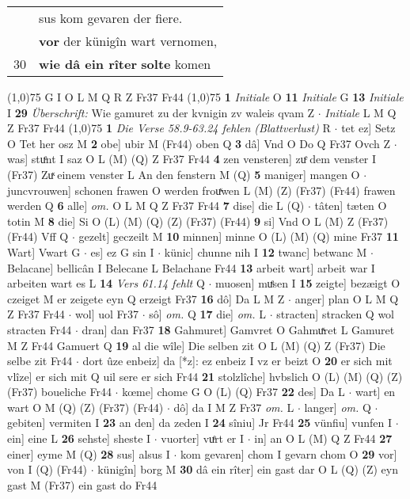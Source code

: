\documentclass[8pt,a4paper,notitlepage]{article}
\begin{document}
\begin{table}[ht]
\begin{minipage}[t]{0.5\linewidth}
\begin{tabular}{rl}
 & sus kom gevaren der fiere.\\ 
 & \textbf{vor} der künigîn wart vernomen,\\ 
30 & \textbf{wie dâ ein rîter} \textbf{solte} komen\\ 
\end{tabular}
\scriptsize
\line(1,0){75} \newline
G I O L M Q R Z Fr37 Fr44 \newline
\line(1,0){75} \newline
\textbf{1} \textit{Initiale} O  \textbf{11} \textit{Initiale} G  \textbf{13} \textit{Initiale} I  \textbf{29} \textit{Überschrift:} Wie gamuret zu der kvnigin zv waleis qvam Z   $\cdot$ \textit{Initiale} L M Q Z Fr37 Fr44  \newline
\line(1,0){75} \newline
\textbf{1} \textit{Die Verse 58.9-63.24 fehlen (Blattverlust)} R   $\cdot$ tet ez] Setz O Tet her osz M \textbf{2} obe] ubir M (Fr44) oben Q \textbf{3} dâ] Vnd O Do Q Fr37 Ovch Z  $\cdot$ was] stuͤnt I saz O L (M) (Q) Z Fr37 Fr44 \textbf{4} zen vensteren] zuͤ dem venster I (Fr37) Zuͯ einem venster L An den fenstern M (Q) \textbf{5} maniger] mangen O  $\cdot$ juncvrouwen] schonen frawen O werden frouͯwen L (M) (Z) (Fr37) (Fr44) frawen werden Q \textbf{6} alle] \textit{om.} O L M Q Z Fr37 Fr44 \textbf{7} dise] die L (Q)  $\cdot$ tâten] tæten O totin M \textbf{8} die] Si O (L) (M) (Q) (Z) (Fr37) (Fr44) \textbf{9} si] Vnd O L (M) Z (Fr37) (Fr44) Vff Q  $\cdot$ gezelt] geczeilt M \textbf{10} minnen] minne O (L) (M) (Q) mine Fr37 \textbf{11} Wart] Vwart G  $\cdot$ es] ez G sin I  $\cdot$ künic] chunne nih I \textbf{12} twanc] betwanc M  $\cdot$ Belacane] bellicân I Belecane L Belachane Fr44 \textbf{13} arbeit wart] arbeit war I arbeiten wart es L \textbf{14} \textit{Vers 61.14 fehlt} Q   $\cdot$ muosen] muͤsen I \textbf{15} zeigte] bezæigt O czeiget M er zeigete eyn Q erzeigt Fr37 \textbf{16} dô] Da L M Z  $\cdot$ anger] plan O L M Q Z Fr37 Fr44  $\cdot$ wol] uol Fr37  $\cdot$ sô] \textit{om.} Q \textbf{17} die] \textit{om.} L  $\cdot$ stracten] stracken Q wol stracten Fr44  $\cdot$ dran] dan Fr37 \textbf{18} Gahmuret] Gamvret O Gahmuͯret L Gamuret M Z Fr44 Gamuert Q \textbf{19} al die wîle] Die selben zit O L (M) (Q) Z (Fr37) Die selbe zit Fr44  $\cdot$ dort ûze enbeiz] da [*z]: ez enbeiz I vz er beizt O \textbf{20} er sich mit vlîze] er sich mit Q uil sere er sich Fr44 \textbf{21} stolzlîche] hvbslich O (L) (M) (Q) (Z) (Fr37) boueliche Fr44  $\cdot$ kœme] chome G O (L) (Q) Fr37 \textbf{22} des] Da L  $\cdot$ wart] en wart O M (Q) (Z) (Fr37) (Fr44)  $\cdot$ dô] da I M Z Fr37 \textit{om.} L  $\cdot$ langer] \textit{om.} Q  $\cdot$ gebiten] vermiten I \textbf{23} an den] da zeden I \textbf{24} sîniu] Jr Fr44 \textbf{25} vünfiu] vunfen I  $\cdot$ ein] eine L \textbf{26} sehste] sheste I  $\cdot$ vuorter] vuͤrt er I  $\cdot$ in] an O L (M) Q Z Fr44 \textbf{27} einer] eyme M (Q) \textbf{28} sus] alsus I  $\cdot$ kom gevaren] chom I gevarn chom O \textbf{29} vor] von I (Q) (Fr44)  $\cdot$ künigîn] borg M \textbf{30} dâ ein rîter] ein gast dar O L (Q) (Z) eyn gast M (Fr37) ein gast do Fr44 \newline

\end{minipage}
\end{table}
\end{document}
